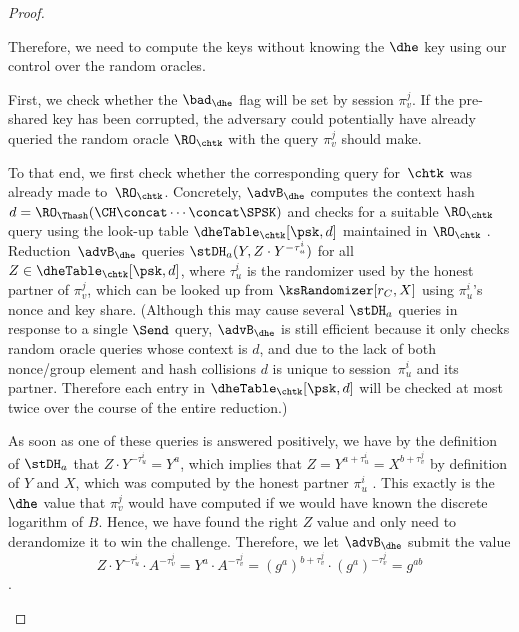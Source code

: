 \begin{proof}
\begin{enumerate}
		Therefore, we need to compute the keys without knowing the $\dhe$ key using our control over the random oracles.
		
		First, we check whether the $\bad_{\dhe}$ flag will be set by session $\pi_v^j$. 
		If the pre-shared key has been corrupted, the adversary could potentially have already queried the random oracle $\RO_{\chtk}$ with the query $\pi_v^j$ should make. 
		
		To that end, we first check whether the corresponding query for~$\chtk$ was already made to~$\RO_{\chtk}$.
		Concretely, $\advB_\dhe$ computes the context hash~$d = \RO_\Thash(\CH \concat \dotsb \concat \SPSK)$ and checks for a suitable $\RO_{\chtk}$ query using the look-up table $\dheTable_{\chtk}[\psk, d]$ maintained in $\RO_{\chtk}$ .
		Reduction~$\advB_\dhe$ queries $\stDH_a(Y, Z \cdot Y^{-\tau_u^i})$ for all $Z \in \dheTable_{\chtk}[\psk, d]$, where $\tau_u^i$ is the randomizer used by the honest partner of $\pi_v^j$, which can be looked up from $\ksRandomizer[r_C,X]$ using $\pi_u^i$'s nonce and key share.
		(Although this may cause several $\stDH_a$ queries in response to a single $\Send$ query, $\advB_\dhe$ is still efficient because it only checks random oracle queries whose context is $d$, and due to the lack of both nonce/group element and hash collisions $d$ is unique to session~$\pi_u^i$ and its partner. Therefore each entry in $\dheTable_{\chtk}[\psk, d]$ will be checked at most twice over the course of the entire reduction.)
		
		As soon as one of these queries is answered positively, we have by the definition of $\stDH_a$ that $Z \cdot Y^{-\tau_u^i} = Y^a$, which implies that $Z = Y^{a + \tau_u^i} = X^{b + \tau_v^j}$ by definition of $Y$ and $X$, which was computed by the honest partner $\pi_u^i$ .
		This exactly is the $\dhe$ value that $\pi_v^j$ would have computed if we would have known the discrete logarithm of $B$.
		Hence, we have found the right $Z$ value and only need to derandomize it to win the challenge.
		Therefore, we let $\advB_\dhe$ submit the value
		\[
			Z \cdot Y^{-\tau_u^i} \cdot A^{-\tau_v^j} = Y^a \cdot A^{-\tau_v^j} = (g^a)^{b + \tau_v^j} \cdot (g^a)^{-\tau_v^j} = g^{ab}
		\]
		.
		

\end{enumerate}
\end{proof}
